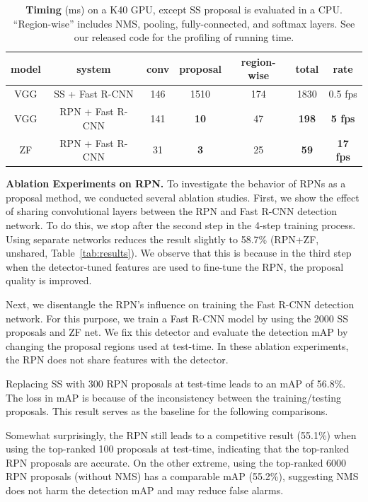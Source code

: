 \documentclass[10pt,journal,cspaper,compsoc]{IEEEtran}
\begin{document}
\begin{table}[t]
\begin{center}
\caption{\textbf{Timing} (ms) on a K40 GPU, except SS proposal is evaluated in a CPU. ``Region-wise'' includes NMS, pooling, fully-connected, and softmax layers. See our released code for the profiling of running time.}
\vspace{-1em}
\small
\begin{tabular}{c|c|ccc|c|c}
  model & system & conv & proposal & region-wise & total & rate \\
  \hline\hline
  VGG & SS + Fast R-CNN & 146 & 1510 & 174 & 1830 & 0.5 fps \\
  VGG & RPN + Fast R-CNN & 141 & \textbf{10} & 47 & \textbf{198} & \textbf{5 fps} \\
  \hline
  ZF & RPN + Fast R-CNN & 31 & \textbf{3} & 25 & \textbf{59}  & \textbf{17 fps}\\
\end{tabular}
\label{tab:time}
\end{center}
\end{table}

\vspace{.5em}
\noindent\textbf{Ablation Experiments on RPN.}
To investigate the behavior of RPNs as a proposal method, we conducted several ablation studies.
First, we show the effect of sharing convolutional layers between the RPN and Fast R-CNN detection network.
To do this, we stop after the second step in the 4-step training process.
Using separate networks reduces the result slightly to 58.7\% (RPN+ZF, unshared, Table~\ref{tab:results}).
We observe that this is because in the third step when the detector-tuned features are used to fine-tune the RPN, the proposal quality is improved.

Next, we disentangle the RPN's influence on training the Fast R-CNN detection network.
For this purpose, we train a Fast R-CNN model by using the 2000 SS proposals and ZF net.
We fix this detector and evaluate the detection mAP by changing the proposal regions used at test-time.
In these ablation experiments, the RPN does not share features with the detector.

Replacing SS with 300 RPN proposals at test-time leads to an mAP of 56.8\%. The loss in mAP is because of the inconsistency between the training/testing proposals. This result serves as the baseline for the following comparisons.

Somewhat surprisingly, the RPN still leads to a competitive result (55.1\%) when using the top-ranked 100 proposals at test-time, indicating that the top-ranked RPN proposals are accurate. On the other extreme, using the top-ranked 6000 RPN proposals (without NMS) has a comparable mAP (55.2\%), suggesting NMS does not harm the detection mAP and may reduce false alarms.
\end{document}
